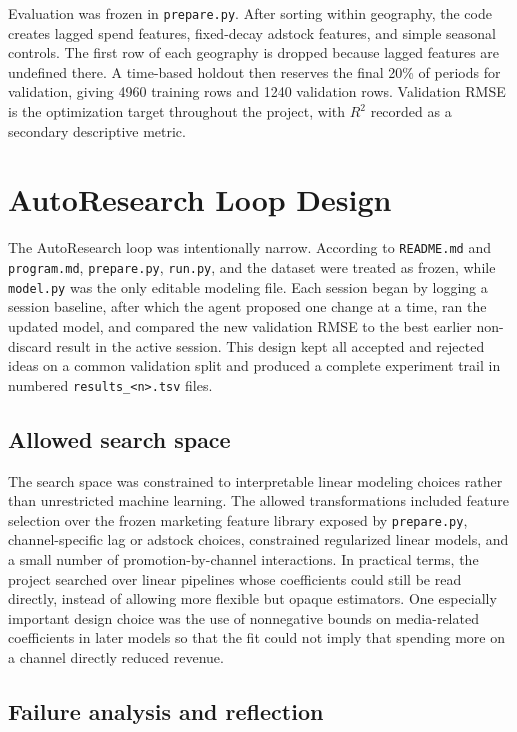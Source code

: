 \documentclass{article}
\begin{document}
Evaluation was frozen in \texttt{prepare.py}. After sorting within geography, the code creates lagged spend features, fixed-decay adstock features, and simple seasonal controls. The first row of each geography is dropped because lagged features are undefined there. A time-based holdout then reserves the final 20\% of periods for validation, giving 4960 training rows and 1240 validation rows. Validation RMSE is the optimization target throughout the project, with $R^2$ recorded as a secondary descriptive metric.

\section{AutoResearch Loop Design}

The AutoResearch loop was intentionally narrow. According to \texttt{README.md} and \texttt{program.md}, \texttt{prepare.py}, \texttt{run.py}, and the dataset were treated as frozen, while \texttt{model.py} was the only editable modeling file. Each session began by logging a session baseline, after which the agent proposed one change at a time, ran the updated model, and compared the new validation RMSE to the best earlier non-discard result in the active session. This design kept all accepted and rejected ideas on a common validation split and produced a complete experiment trail in numbered \texttt{results\_<n>.tsv} files.

\subsection{Allowed search space}

The search space was constrained to interpretable linear modeling choices rather than unrestricted machine learning. The allowed transformations included feature selection over the frozen marketing feature library exposed by \texttt{prepare.py}, channel-specific lag or adstock choices, constrained regularized linear models, and a small number of promotion-by-channel interactions. In practical terms, the project searched over linear pipelines whose coefficients could still be read directly, instead of allowing more flexible but opaque estimators. One especially important design choice was the use of nonnegative bounds on media-related coefficients in later models so that the fit could not imply that spending more on a channel directly reduced revenue.

\subsection{Failure analysis and reflection}
\end{document}
